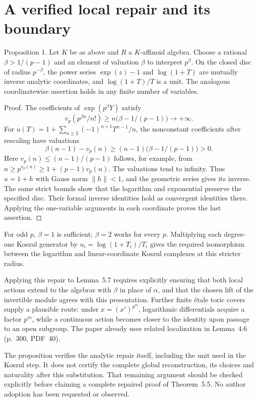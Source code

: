\documentclass[10pt]{article}
\begin{document}
\section*{A verified local repair and its boundary}
Proposition 1.  Let \(K\) be as above and \(R\) a \(K\)-affinoid algebra. Choose a rational \(\beta>1/(p-1)\) and an element of valuation \(\beta\) to interpret \(p^\beta\). On the closed disc of radius \(p^{-\beta}\), the power series \(\exp(z)-1\) and \(\log(1+T)\) are mutually inverse analytic coordinates, and \(\log(1+T)/T\) is a unit. The analogous coordinatewise assertion holds in any finite number of variables.\par
Proof. The coefficients of \(\exp(p^\beta Y)\) satisfy \[v_p(p^{\beta n}/n!)\geq
 n\bigl(\beta-1/(p-1)\bigr)\longrightarrow+\infty.\] For \(u(T)=1+\sum_{n\geq2}(-1)^{n+1}T^{n-1}/n\), the nonconstant coefficients after rescaling have valuations \[\beta(n-1)-v_p(n)
 \geq (n-1)\bigl(\beta-1/(p-1)\bigr)>0.\] Here \(v_p(n)\leq(n-1)/(p-1)\) follows, for example, from \(n\geq p^{v_p(n)}\geq1+(p-1)v_p(n)\). The valuations tend to infinity. Thus \(u=1+h\) with Gauss norm \(\|h\|<1\), and the geometric series gives its inverse. The same strict bounds show that the logarithm and exponential preserve the specified disc. Their formal inverse identities hold as convergent identities there. Applying the one-variable arguments in each coordinate proves the last assertion. ◻\par
For odd \(p\), \(\beta=1\) is sufficient; \(\beta=2\) works for every \(p\). Multiplying each degree-one Koszul generator by \(u_i=\log(1+T_i)/T_i\) gives the required isomorphism between the logarithm and linear-coordinate Koszul complexes at this stricter radius.\par
Applying this repair to Lemma 5.7 requires explicitly ensuring that both local actions extend to the algebras with \(\beta\) in place of \(\alpha\), and that the chosen lift of the invertible module agrees with this presentation. Further finite étale toric covers supply a plausible route: under \(x=(x')^{p^m}\), logarithmic differentials acquire a factor \(p^m\), while a continuous action becomes closer to the identity upon passage to an open subgroup. The paper already uses related localization in Lemma 4.6 (p. 300, PDF 40).\par
The proposition verifies the analytic repair itself, including the unit used in the Koszul step. It does not certify the complete global reconstruction, its choices and naturality after this substitution. That remaining argument should be checked explicitly before claiming a complete repaired proof of Theorem 5.5. No author adoption has been requested or observed.\par
\end{document}
